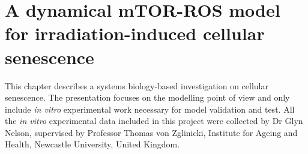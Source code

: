 \graphicspath{{Chapter7/Chapter7Figs/}}

\chapter{A dynamical mTOR-ROS model for irradiation-induced cellular senescence}
\label{chap:A dynamical mTOR-ROS model for cellular senescence}
This chapter describes a systems biology-based investigation on cellular senescence. The presentation focuses on the modelling point of view and only include \emph{in vitro} experimental work necessary for model validation and test. All the \emph{in vitro} experimental data included in this project were collected by Dr Glyn Nelson, supervised by Professor Thomas von Zglinicki, Institute for Ageing and Health, Newcastle University, United Kingdom.

